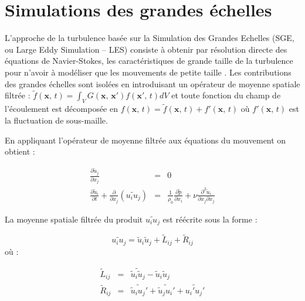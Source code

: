 \chapter{\label{sec:LES}Simulations des grandes \'echelles}
L'approche de la turbulence bas\'ee sur la Simulation des Grandes Echelles
(SGE, ou Large Eddy Simulation -- LES) consiste \`a obtenir par r\'esolution
directe des \'equations de Navier-Stokes, les caract\'eristiques de grande
taille de la turbulence pour n'avoir \`a mod\'eliser que les mouvements
de \og petite taille \fg{}. Les contributions des grandes \'echelles
sont isol\'ees en introduisant un op\'erateur de moyenne spatiale filtr\'ee
: $\tilde{f}(\mathbf{x},\,t)=\int_{V}G(\mathbf{x},\,\mathbf{x}')f(\mathbf{x}',\,t)dV$
et toute fonction du champ de l'\'ecoulement est d\'ecompos\'ee en $f(\mathbf{x},\,t)=\tilde{f}(\mathbf{x},\,t)+f'(\mathbf{x},\,t)$
o\`u $f'(\mathbf{x},\,t)$ est la fluctuation de sous-maille.

En appliquant l'op\'erateur de moyenne filtr\'ee aux \'equations du mouvement
on obtient :

\begin{subequations}

\begin{eqnarray}
\frac{\partial\tilde{u}_{j}}{\partial x_{j}} & = & 0\label{eq:divu_LES}\\
\frac{\partial\tilde{u}_{i}}{\partial t}+\frac{\partial}{\partial x_{j}}(\widetilde{u_{i}u_{j}}) & = & \frac{1}{\rho_{0}}\frac{\partial\tilde{p}}{\partial x_{i}}+\nu\frac{\partial^{2}\tilde{u}_{i}}{\partial x_{j}\partial x_{j}}\label{eq:QDM_LES}
\end{eqnarray}


\end{subequations}

La moyenne spatiale filtr\'ee du produit $\widetilde{u_{i}u_{j}}$ est
r\'e\'ecrite sous la forme :

\[
\widetilde{u_{i}u_{j}}=\tilde{u}_{i}\tilde{u}_{j}+\tilde{L}_{ij}+\tilde{R}_{ij}
\]
o\`u :

\begin{subequations}

\begin{eqnarray}
\tilde{L}_{ij} & = & \widetilde{\tilde{u}_{i}\tilde{u}_{j}}-\tilde{u}_{i}\tilde{u}_{j}\label{eq:Tension-Leonard}\\
\tilde{R}_{ij} & = & \widetilde{\tilde{u}_{i}u_{j}'}+\widetilde{\tilde{u}_{j}u_{i}'}+\widetilde{u_{i}'u_{j}'}\label{eq:Tension-Reynolds}
\end{eqnarray}


\end{subequations}

